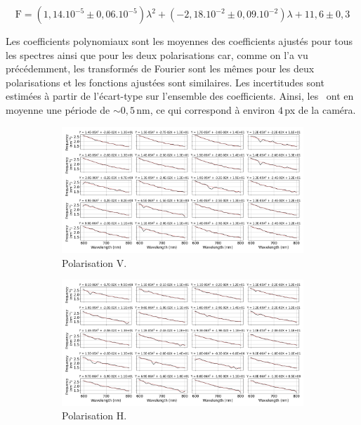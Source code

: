 \begin{equation}
    \text{F} = (1,14.10^{-5} \pm 0,06.10^{-5}) \lambda^2 + (-2,18.10^{-2} \pm 0,09.10^{-2}) \lambda + 11,6 \pm 0,3
\end{equation}

Les coefficients polynomiaux sont les moyennes des coefficients ajustés pour tous les spectres ainsi que pour les deux polarisations car, comme on l'a vu précédemment, les transformés de Fourier sont les mêmes pour les deux polarisations et les fonctions ajustées sont similaires. Les incertitudes sont estimées à partir de l'écart-type sur l'ensemble des coefficients. Ainsi, les \wiggles~ont en moyenne une période de $\sim 0,5 \,$nm, ce qui correspond à environ $4 \,$px de la caméra.

\begin{figure}[ht!]
    \centering
    \begin{subfigure}{0.8\textwidth}
        \centering
        \includegraphics[width=\textwidth]{Figure_Chap4/20220811_P2VM_01_Flat1_InputOutput_Spectra_fftMaxFit_Pola1.png}
        \caption{Polarisation V.}
        \label{fig:WigglesFitMaxFFTCutA}
    \end{subfigure}
    \begin{subfigure}{0.8\textwidth}
        \centering
        \includegraphics[width=\textwidth]{Figure_Chap4/20220811_P2VM_01_Flat1_InputOutput_Spectra_fftMaxFit_Pola2.png}
        \caption{Polarisation H.}
        \label{fig:WigglesFitMaxFFTCutB}
    \end{subfigure}
    \caption[]{}
    \label{fig:WigglesFitMaxFFTCut}
\end{figure}


